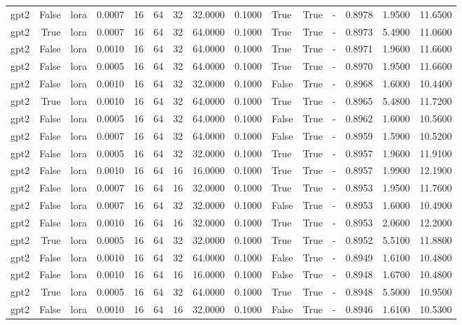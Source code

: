 \begin{tabular}{lrlrrrrrrlllrrr}
gpt2 & False & lora & 0.0007 & 16 & 64 & 32 & 32.0000 & 0.1000 & True & True & - & 0.8978 & 1.9500 & 11.6500 \\
gpt2 & True & lora & 0.0007 & 16 & 64 & 32 & 64.0000 & 0.1000 & True & True & - & 0.8973 & 5.4900 & 11.0600 \\
gpt2 & False & lora & 0.0010 & 16 & 64 & 32 & 64.0000 & 0.1000 & True & True & - & 0.8971 & 1.9600 & 11.6600 \\
gpt2 & False & lora & 0.0005 & 16 & 64 & 32 & 64.0000 & 0.1000 & True & True & - & 0.8970 & 1.9500 & 11.6600 \\
gpt2 & False & lora & 0.0010 & 16 & 64 & 32 & 32.0000 & 0.1000 & False & True & - & 0.8968 & 1.6000 & 10.4400 \\
gpt2 & True & lora & 0.0010 & 16 & 64 & 32 & 64.0000 & 0.1000 & True & True & - & 0.8965 & 5.4800 & 11.7200 \\
gpt2 & False & lora & 0.0005 & 16 & 64 & 32 & 64.0000 & 0.1000 & False & True & - & 0.8962 & 1.6000 & 10.5600 \\
gpt2 & False & lora & 0.0007 & 16 & 64 & 32 & 64.0000 & 0.1000 & False & True & - & 0.8959 & 1.5900 & 10.5200 \\
gpt2 & False & lora & 0.0005 & 16 & 64 & 32 & 32.0000 & 0.1000 & True & True & - & 0.8957 & 1.9600 & 11.9100 \\
gpt2 & False & lora & 0.0010 & 16 & 64 & 16 & 16.0000 & 0.1000 & True & True & - & 0.8957 & 1.9900 & 12.1900 \\
gpt2 & False & lora & 0.0007 & 16 & 64 & 16 & 32.0000 & 0.1000 & True & True & - & 0.8953 & 1.9500 & 11.7600 \\
gpt2 & False & lora & 0.0007 & 16 & 64 & 32 & 32.0000 & 0.1000 & False & True & - & 0.8953 & 1.6000 & 10.4900 \\
gpt2 & False & lora & 0.0010 & 16 & 64 & 16 & 32.0000 & 0.1000 & True & True & - & 0.8953 & 2.0600 & 12.2000 \\
gpt2 & True & lora & 0.0005 & 16 & 64 & 32 & 32.0000 & 0.1000 & True & True & - & 0.8952 & 5.5100 & 11.8800 \\
gpt2 & False & lora & 0.0010 & 16 & 64 & 32 & 64.0000 & 0.1000 & False & True & - & 0.8949 & 1.6100 & 10.4800 \\
gpt2 & False & lora & 0.0010 & 16 & 64 & 16 & 16.0000 & 0.1000 & False & True & - & 0.8948 & 1.6700 & 10.4800 \\
gpt2 & True & lora & 0.0005 & 16 & 64 & 32 & 64.0000 & 0.1000 & True & True & - & 0.8948 & 5.5000 & 10.9500 \\
gpt2 & False & lora & 0.0010 & 16 & 64 & 16 & 32.0000 & 0.1000 & False & True & - & 0.8946 & 1.6100 & 10.5300 \\

\end{tabular}
